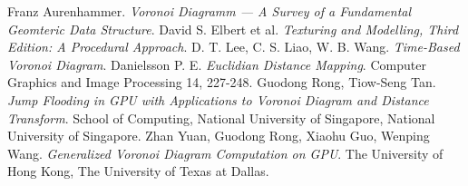 \documentclass[12pt]{article}
\begin{document}
\begin{thebibliography}{10}
 Franz Aurenhammer. \textit{Voronoi Diagramm --- A Survey of a Fundamental Geomteric Data Structure}.
 David S. Elbert et al. \textit{Texturing and Modelling, Third Edition: A Procedural Approach}.
 D. T. Lee, C. S. Liao, W. B. Wang. \textit{Time-Based Voronoi Diagram}.
 Danielsson P. E. \textit{Euclidian Distance Mapping}. Computer Graphics and Image Processing 14, 227-248.
 Guodong Rong, Tiow-Seng Tan. \textit{Jump Flooding in GPU with Applications to Voronoi Diagram and Distance Transform}. School of Computing, National University of Singapore, National University of Singapore. 
 Zhan Yuan, Guodong Rong, Xiaohu Guo, Wenping Wang. \textit{Generalized Voronoi Diagram Computation on GPU}. The University of Hong Kong, The University of Texas at Dallas.
\end{thebibliography}
\end{document}
